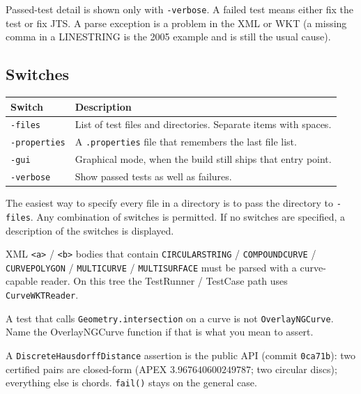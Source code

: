 \documentclass[11pt]{article}
\begin{document}
Passed-test detail is shown only with \texttt{-verbose}. A failed
test means either fix the test or fix JTS. A parse exception is a
problem in the XML or WKT (a missing comma in a LINESTRING is the
2005 example and is still the usual cause).

\subsection{Switches}
\begin{center}
\begin{tabular}{>{\raggedright\arraybackslash}p{3.0cm}p{10.2cm}}
  \toprule
  \textbf{Switch} & \textbf{Description} \\
  \midrule
  \texttt{-files}      & List of test files and directories. Separate
                         items with spaces. \\
  \texttt{-properties} & A \texttt{.properties} file that remembers
                         the last file list. \\
  \texttt{-gui}        & Graphical mode, when the build still ships
                         that entry point. \\
  \texttt{-verbose}    & Show passed tests as well as failures. \\
  \bottomrule
\end{tabular}
\end{center}

The easiest way to specify every file in a directory is to pass the
directory to \texttt{-files}. Any combination of switches is
permitted. If no switches are specified, a description of the
switches is displayed.

\begin{amendment}
XML \texttt{<a>} / \texttt{<b>} bodies that contain
\texttt{CIRCULARSTRING} / \texttt{COMPOUNDCURVE} /
\texttt{CURVEPOLYGON} / \texttt{MULTICURVE} / \texttt{MULTISURFACE}
must be parsed with a curve-capable reader. On this tree the
TestRunner / TestCase path uses \texttt{CurveWKTReader}.

A test that calls \texttt{Geometry.intersection} on a curve is not
\texttt{OverlayNGCurve}. Name the OverlayNGCurve function if that is
what you mean to assert.

A \texttt{DiscreteHausdorffDistance} assertion is the public API
(commit \texttt{0ca71b}): two certified pairs are closed-form
(APEX $3.967640600249787$; two circular discs); everything else is
chords. \texttt{fail()} stays on the general case.
\end{amendment}
\end{document}

